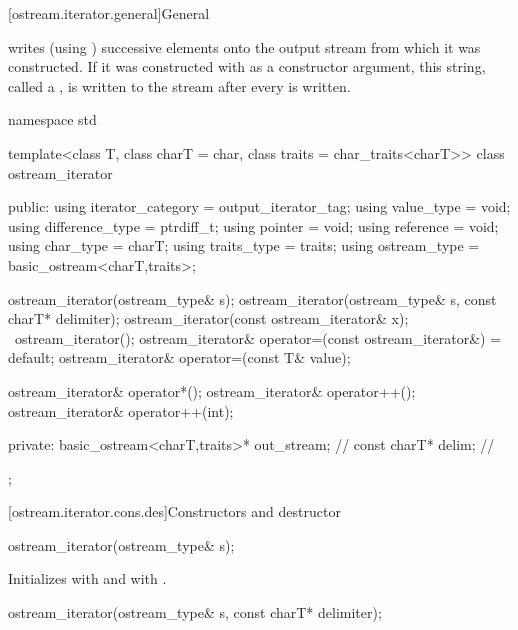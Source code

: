 [ostream.iterator.general]{General}

\pnum
{}%
writes (using
)
successive elements onto the output stream from which it was constructed.
If it was constructed with
as a constructor argument, this string, called a
,
is written to the stream after every
is written.

\begin{codeblock}
namespace std {
  template<class T, class charT = char, class traits = char_traits<charT>>
  class ostream_iterator {
  public:
    using iterator_category = output_iterator_tag;
    using value_type        = void;
    using difference_type   = ptrdiff_t;
    using pointer           = void;
    using reference         = void;
    using char_type         = charT;
    using traits_type       = traits;
    using ostream_type      = basic_ostream<charT,traits>;

    ostream_iterator(ostream_type& s);
    ostream_iterator(ostream_type& s, const charT* delimiter);
    ostream_iterator(const ostream_iterator& x);
    ~ostream_iterator();
    ostream_iterator& operator=(const ostream_iterator&) = default;
    ostream_iterator& operator=(const T& value);

    ostream_iterator& operator*();
    ostream_iterator& operator++();
    ostream_iterator& operator++(int);

  private:
    basic_ostream<charT,traits>* out_stream;            // \expos
    const charT* delim;                                 // \expos
  };
}
\end{codeblock}

[ostream.iterator.cons.des]{Constructors and destructor}

%
\begin{itemdecl}
ostream_iterator(ostream_type& s);
\end{itemdecl}

\begin{itemdescr}
\pnum
\effects
Initializes  with  and
 with .
\end{itemdescr}


%
\begin{itemdecl}
ostream_iterator(ostream_type& s, const charT* delimiter);
\end{itemdecl}

